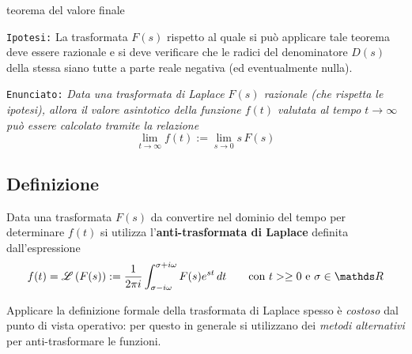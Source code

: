 		\begin{teorema}{teorema del valore finale}
		
			\texttt{Ipotesi:}  \label{teor:valfinale} La trasformata $F(s)$ rispetto al quale si può applicare tale teorema deve essere razionale e si deve verificare che le radici del denominatore $D(s)$ della stessa siano tutte a parte reale negativa (ed eventualmente nulla). \vspace{3mm}
			
			\texttt{Enunciato:} \textit{Data una trasformata di Laplace $F(s)$ razionale (che rispetta le ipotesi), allora il valore asintotico della funzione $f(t)$ valutata al tempo $t\rightarrow \infty$ può essere calcolato tramite la relazione}
			\begin{equation}
				\lim_{t\rightarrow \infty}f(t) := \lim_{s\rightarrow 0} s\,F(s)
			\end{equation}
		\end{teorema}
	
	\subsection{Definizione}
		\begin{concetto}
			Data una trasformata $F(s)$ da convertire nel dominio del tempo per determinare $f(t)$ si utilizza l'\textbf{anti-trasformata di Laplace} definita dall'espressione
			\begin{equation}
				f(t) = \trasf{F(s)} := \frac{1}{2\pi i} \int_{\sigma-i\omega}^{\sigma+i\omega} F(s) e^{st} \, dt \qquad \textrm{con $t>\geq 0$ e } \sigma \in \mathds R
			\end{equation}
		\end{concetto}
		Applicare la definizione formale della trasformata di Laplace spesso è \textit{costoso} dal punto di vista operativo: per questo in generale si utilizzano dei \textit{metodi alternativi} per anti-trasformare le funzioni.
		
